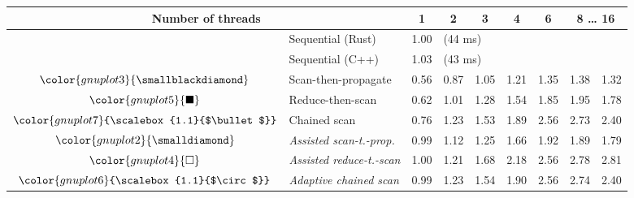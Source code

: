 \begin{tabular}{clrrrrrrr}
\toprule
\multicolumn{2}{c}{\textbf{Number of threads}} & \multicolumn{1}{c}{\textbf{ 1 }} & \multicolumn{1}{c}{\textbf{ 2 }} & \multicolumn{1}{c}{\textbf{ 3 }} & \multicolumn{1}{c}{\textbf{ 4 }} & \multicolumn{1}{c}{\textbf{ 6 }} & \multicolumn{2}{c}{\textbf{ 8 } \dots \textbf{ 16 }} \\
\midrule
& Sequential (Rust) & \multicolumn{1}{r}{ 1.00 } & \multicolumn{ 6 }{l}{(44 ms)} \\
& Sequential (C++) & \multicolumn{1}{r}{ 1.03 } & \multicolumn{ 6 }{l}{(43 ms)} \\
\rowcolor{gnuplot3!10}$\color{gnuplot3}{\smallblackdiamond}$ & Scan-then-propagate & \cellcolor{gnuplot3!10} 0.56 & \cellcolor{gnuplot3!10} 0.87 & \cellcolor{gnuplot3!10} 1.05 & \cellcolor{gnuplot3!10} 1.21 & \cellcolor{gnuplot3!10} 1.35 & \cellcolor{gnuplot3!10} 1.38 & \cellcolor{gnuplot3!10} 1.32 \\
\rowcolor{gnuplot5!10}$\color{gnuplot5}{\blacksquare}$ & Reduce-then-scan & \cellcolor{gnuplot5!10} 0.62 & \cellcolor{gnuplot5!10} 1.01 & \cellcolor{gnuplot5!10} 1.28 & \cellcolor{gnuplot5!10} 1.54 & \cellcolor{gnuplot5!10} 1.85 & \cellcolor{gnuplot5!10} 1.95 & \cellcolor{gnuplot5!10} 1.78 \\
\rowcolor{gnuplot7!10}$\color{gnuplot7}{\scalebox{1.1}{$\bullet$}}$ & Chained scan & \cellcolor{gnuplot7!10} 0.76 & \cellcolor{gnuplot7!10} 1.23 & \cellcolor{gnuplot7!10} 1.53 & \cellcolor{gnuplot7!10} 1.89 & \cellcolor{gnuplot7!10} 2.56 & \cellcolor{gnuplot7!10} 2.73 & \cellcolor{gnuplot7!10} 2.40 \\
\rowcolor{gnuplot2!30}$\color{gnuplot2}{\smalldiamond}$ & \textit{Assisted scan-t.-prop.} & \cellcolor{gnuplot2!30} 0.99 & \cellcolor{gnuplot2!30} 1.12 & \cellcolor{gnuplot2!30} 1.25 & \cellcolor{gnuplot2!30} 1.66 & \cellcolor{gnuplot2!30} 1.92 & \cellcolor{gnuplot2!30} 1.89 & \cellcolor{gnuplot2!30} 1.79 \\
\rowcolor{gnuplot4!30}$\color{gnuplot4}{\square}$ & \textit{Assisted reduce-t.-scan} & \cellcolor{gnuplot4!30} 1.00 & \cellcolor{gnuplot4!30} 1.21 & \cellcolor{gnuplot4!30} 1.68 & \cellcolor{gnuplot4!30} 2.18 & \cellcolor{gnuplot4!30} 2.56 & \cellcolor{gnuplot4!30} 2.78 & \cellcolor{gnuplot4!30} 2.81 \\
\rowcolor{gnuplot6!30}$\color{gnuplot6}{\scalebox{1.1}{$\circ$}}$ & \textit{Adaptive chained scan} & \cellcolor{gnuplot6!30} 0.99 & \cellcolor{gnuplot6!30} 1.23 & \cellcolor{gnuplot6!30} 1.54 & \cellcolor{gnuplot6!30} 1.90 & \cellcolor{gnuplot6!30} 2.56 & \cellcolor{gnuplot6!30} 2.74 & \cellcolor{gnuplot6!30} 2.40 \\

\end{tabular}
